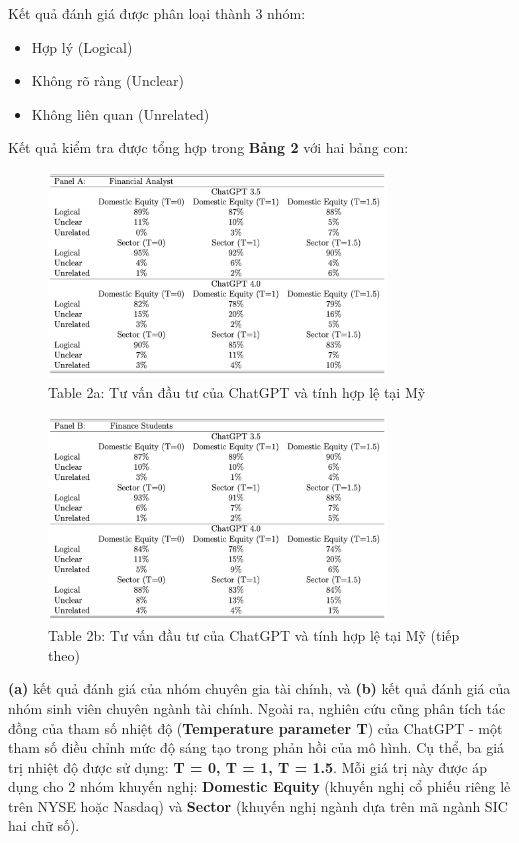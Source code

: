 \documentclass[a4paper,12pt]{article}
\begin{document}
Kết quả đánh giá được phân loại thành 3 nhóm:

\begin{itemize}
    \item Hợp lý (Logical)
    \item Không rõ ràng (Unclear)
    \item Không liên quan (Unrelated)
\end{itemize}
Kết quả kiểm tra được tổng hợp trong \textbf{Bảng 2} với hai bảng con: 
\begin{figure}[H]
    \centering
    \includegraphics[width=0.8\textwidth]{table/tab2a.png}
    \caption*{Table 2a: Tư vấn đầu tư của ChatGPT và tính hợp lệ tại Mỹ}
\end{figure}
\begin{figure}[H]
    \centering
    \includegraphics[width=0.8\textwidth]{table/tab2b.png}
    \caption*{Table 2b: Tư vấn đầu tư của ChatGPT và tính hợp lệ tại Mỹ (tiếp theo)}
\end{figure}
\textbf{(a)} kết quả đánh giá của nhóm chuyên gia tài chính, và \textbf{(b)} kết quả đánh giá của nhóm sinh viên chuyên ngành tài chính. Ngoài ra, nghiên cứu cũng phân tích tác đồng của tham số nhiệt độ (\textbf{Temperature parameter T}) của ChatGPT - một tham số điều chỉnh mức độ sáng tạo trong phản hồi của mô hình. Cụ thể, ba giá trị nhiệt độ được sử dụng: \textbf{T = 0, T = 1, T = 1.5}. Mỗi giá trị này được áp dụng cho 2 nhóm khuyến nghị: \textbf{Domestic Equity} (khuyến nghị cổ phiếu riêng lẻ trên NYSE hoặc Nasdaq) và \textbf{Sector} (khuyến nghị ngành dựa trên mã ngành SIC hai chữ số).
\end{document}
